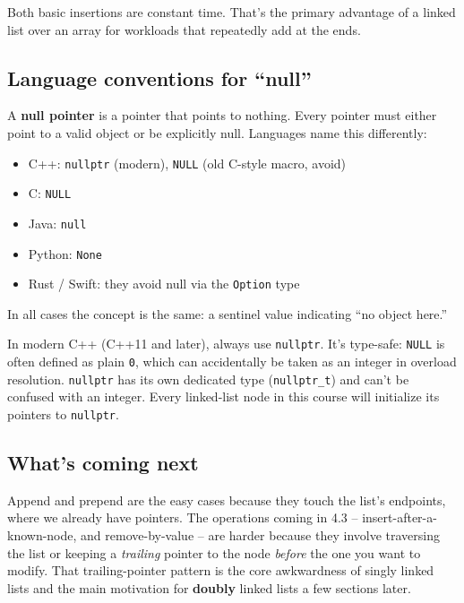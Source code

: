 \documentclass[11pt]{article}
\begin{document}
Both basic insertions are constant time. That's the primary
advantage of a linked list over an array for workloads that
repeatedly add at the ends.

\subsection{Language conventions for ``null''}

\begin{defnbox}[Null]
A \textbf{null pointer} is a pointer that points to nothing. Every
pointer must either point to a valid object or be explicitly null.
Languages name this differently:
\begin{itemize}[leftmargin=*]
  \item C++: \texttt{nullptr} (modern), \texttt{NULL} (old C-style macro, avoid)
  \item C: \texttt{NULL}
  \item Java: \texttt{null}
  \item Python: \texttt{None}
  \item Rust / Swift: they avoid null via the \texttt{Option} type
\end{itemize}
In all cases the concept is the same: a sentinel value indicating
``no object here.''
\end{defnbox}

\begin{warnbox}
In modern C++ (C++11 and later), always use \texttt{nullptr}. It's
type-safe: \texttt{NULL} is often defined as plain \texttt{0}, which
can accidentally be taken as an integer in overload resolution.
\texttt{nullptr} has its own dedicated type (\texttt{nullptr\_t}) and
can't be confused with an integer. Every linked-list node in this
course will initialize its pointers to \texttt{nullptr}.
\end{warnbox}

\subsection{What's coming next}

\begin{ideabox}
Append and prepend are the easy cases because they touch the list's
endpoints, where we already have pointers. The operations coming in
4.3 -- insert-after-a-known-node, and remove-by-value -- are harder
because they involve traversing the list or keeping a \emph{trailing}
pointer to the node \emph{before} the one you want to modify. That
trailing-pointer pattern is the core awkwardness of singly linked
lists and the main motivation for \textbf{doubly} linked lists a
few sections later.
\end{ideabox}
\end{document}
